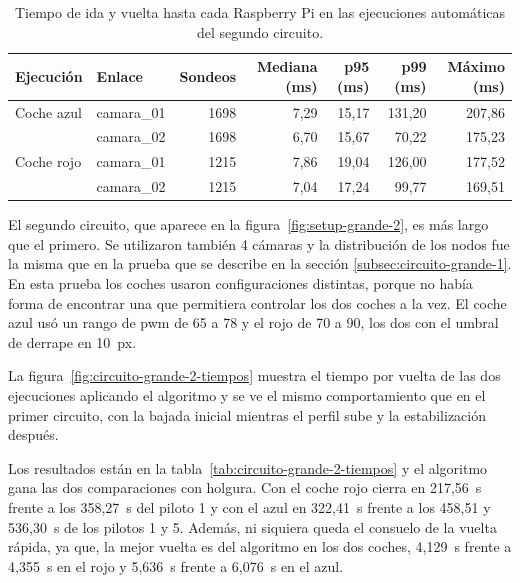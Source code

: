 \begin{table}[btp]
  \centering
  \estilotabla
  \begin{tabular}{l|l|r|r|r|r|r}
    \rowcolor{udcpink!25}
    \textbf{Ejecución} & \textbf{Enlace} & \textbf{Sondeos} & \textbf{Mediana  (ms)} & \textbf{p95  (ms)} & \textbf{p99  (ms)} & \textbf{Máximo  (ms)} \\
    \hline
    Coche azul & camara\_01 & 1698 & 7,29 & 15,17 & 131,20 & 207,86 \\
               & camara\_02 & 1698 & 6,70 & 15,67 & 70,22 & 175,23 \\
    Coche rojo & camara\_01 & 1215 & 7,86 & 19,04 & 126,00 & 177,52 \\
               & camara\_02 & 1215 & 7,04 & 17,24 & 99,77 & 169,51 \\
  \end{tabular}
  \caption{Tiempo de ida y vuelta hasta cada Raspberry Pi en las ejecuciones automáticas del segundo circuito.}
  \label{tab:circuito-grande-2-red}
\end{table}

El segundo circuito, que aparece en la figura~\ref{fig:setup-grande-2}, es más largo que el primero. Se utilizaron también 4 cámaras y la distribución de los nodos fue la misma que en la prueba que se describe en la sección \ref{subsec:circuito-grande-1}. En esta prueba los coches usaron configuraciones distintas, porque no había forma de encontrar una que permitiera controlar los dos coches a la vez. El coche azul usó un rango de \gls{pwm} de 65 a 78 y el rojo de 70 a 90, los dos con el umbral de derrape en 10~px.

La figura~\ref{fig:circuito-grande-2-tiempos} muestra el tiempo por vuelta de las dos ejecuciones aplicando el algoritmo y se ve el mismo comportamiento que en el primer circuito, con la bajada inicial mientras el perfil sube y la estabilización después.

Los resultados están en la tabla~\ref{tab:circuito-grande-2-tiempos} y el algoritmo gana las dos comparaciones con holgura. Con el coche rojo cierra en 217,56~s frente a los 358,27~s del piloto 1 y con el azul en 322,41~s frente a los 458,51 y 536,30~s de los pilotos 1 y 5. Además, ni siquiera queda el consuelo de la vuelta rápida, ya que, la mejor vuelta es del algoritmo en los dos coches, 4,129~s frente a 4,355~s en el rojo y 5,636~s frente a 6,076~s en el azul.

